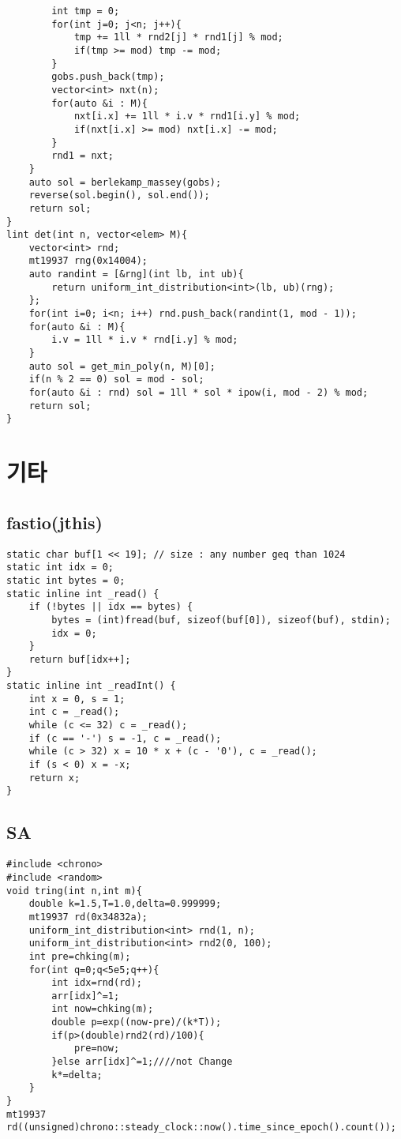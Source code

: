 \documentclass[landscape, 8pt, a4paper, oneside, twocolumn]{extarticle}
\begin{document}
\begin{verbatim}
		int tmp = 0;
		for(int j=0; j<n; j++){
			tmp += 1ll * rnd2[j] * rnd1[j] % mod;
			if(tmp >= mod) tmp -= mod;
		}
		gobs.push_back(tmp);
		vector<int> nxt(n);
		for(auto &i : M){
			nxt[i.x] += 1ll * i.v * rnd1[i.y] % mod;
			if(nxt[i.x] >= mod) nxt[i.x] -= mod;
		}
		rnd1 = nxt;
	}
	auto sol = berlekamp_massey(gobs);
	reverse(sol.begin(), sol.end());
	return sol;
}
lint det(int n, vector<elem> M){
	vector<int> rnd;
	mt19937 rng(0x14004);
	auto randint = [&rng](int lb, int ub){
		return uniform_int_distribution<int>(lb, ub)(rng);
	};
	for(int i=0; i<n; i++) rnd.push_back(randint(1, mod - 1));
	for(auto &i : M){
		i.v = 1ll * i.v * rnd[i.y] % mod;
	}
	auto sol = get_min_poly(n, M)[0];
	if(n % 2 == 0) sol = mod - sol;
	for(auto &i : rnd) sol = 1ll * sol * ipow(i, mod - 2) % mod;
	return sol;
}
\end{verbatim}
\section{기타}
\subsection{fastio(jthis)}
\begin{verbatim}
static char buf[1 << 19]; // size : any number geq than 1024
static int idx = 0;
static int bytes = 0;
static inline int _read() {
	if (!bytes || idx == bytes) {
		bytes = (int)fread(buf, sizeof(buf[0]), sizeof(buf), stdin);
		idx = 0;
	}
	return buf[idx++];
}
static inline int _readInt() {
	int x = 0, s = 1;
	int c = _read();
	while (c <= 32) c = _read();
	if (c == '-') s = -1, c = _read();
	while (c > 32) x = 10 * x + (c - '0'), c = _read();
	if (s < 0) x = -x;
	return x;
}
\end{verbatim}
\subsection{SA}
\begin{verbatim}
#include <chrono>
#include <random>
void tring(int n,int m){
    double k=1.5,T=1.0,delta=0.999999;
    mt19937 rd(0x34832a);
    uniform_int_distribution<int> rnd(1, n);
    uniform_int_distribution<int> rnd2(0, 100);
    int pre=chking(m);
    for(int q=0;q<5e5;q++){
        int idx=rnd(rd);
        arr[idx]^=1;
        int now=chking(m);
        double p=exp((now-pre)/(k*T));
        if(p>(double)rnd2(rd)/100){
            pre=now;
        }else arr[idx]^=1;////not Change
        k*=delta;
    }
}
mt19937 rd((unsigned)chrono::steady_clock::now().time_since_epoch().count());
\end{verbatim}
\end{document}
